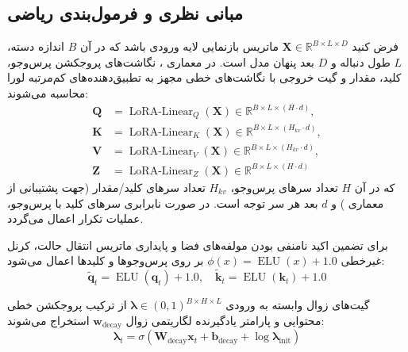 \subsection{مبانی نظری و فرمول‌بندی ریاضی}
فرض کنید $\mathbf{X} \in \mathbb{R}^{B \times L \times D}$ ماتریس بازنمایی لایه ورودی باشد که در آن $B$ اندازه دسته، $L$ طول دنباله و $D$ بعد پنهان مدل است. در معماری ، نگاشت‌های پروجکشن پرس‌وجو، کلید، مقدار و گیت خروجی با نگاشت‌های خطی مجهز به تطبیق‌دهنده‌های کم‌مرتبه لورا  محاسبه می‌شوند:
\begin{align}
\mathbf{Q} &= \operatorname{LoRA-Linear}_Q(\mathbf{X}) \in \mathbb{R}^{B \times L \times (H \cdot d)}, \\
\mathbf{K} &= \operatorname{LoRA-Linear}_K(\mathbf{X}) \in \mathbb{R}^{B \times L \times (H_{kv} \cdot d)}, \\
\mathbf{V} &= \operatorname{LoRA-Linear}_V(\mathbf{X}) \in \mathbb{R}^{B \times L \times (H_{kv} \cdot d)}, \\
\mathbf{Z} &= \operatorname{LoRA-Linear}_Z(\mathbf{X}) \in \mathbb{R}^{B \times L \times (H \cdot d)}
\end{align}
که در آن $H$ تعداد سرهای پرس‌وجو، $H_{kv}$ تعداد سرهای کلید/مقدار (جهت پشتیبانی از معماری ) و $d$ بعد هر سر توجه است. در صورت نابرابری سرهای کلید با پرس‌وجو، عملیات تکرار  اعمال می‌گردد.

برای تضمین اکید نامنفی بودن مولفه‌های فضا و پایداری ماتریس انتقال حالت، کرنل غیرخطی $\phi(x) = \operatorname{ELU}(x) + 1.0$ بر روی پرس‌وجوها و کلیدها اعمال می‌شود:
\begin{equation}
\tilde{\mathbf{q}}_t = \operatorname{ELU}(\mathbf{q}_t) + 1.0, \quad \tilde{\mathbf{k}}_t = \operatorname{ELU}(\mathbf{k}_t) + 1.0
\end{equation}

گیت‌های زوال وابسته به ورودی $\boldsymbol{\lambda} \in (0, 1)^{B \times H \times L}$ از ترکیب پروجکشن خطی محتوایی و پارامتر یادگیرنده لگاریتمی زوال $\mathbf{w}_{\text{decay}}$ استخراج می‌شوند:
\begin{equation}
\boldsymbol{\lambda}_t = \sigma\left(\mathbf{W}_{\text{decay}} \mathbf{x}_t + \mathbf{b}_{\text{decay}} + \log \boldsymbol{\lambda}_{\text{init}}\right)
\end{equation}

